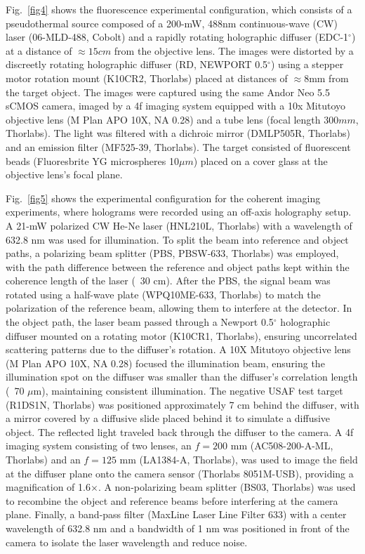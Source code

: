 \documentclass[pdflatex,sn-mathphys-num]{sn-jnl}%
\theoremstyle{thmstyleone}%
\theoremstyle{thmstyletwo}%
\theoremstyle{thmstylethree}%
\begin{document}
Fig.~\ref{fig4} shows the fluorescence experimental configuration, which consists of a pseudothermal source composed of a 200-mW, 488nm continuous-wave (CW) laser (06-MLD-488, Cobolt) and a rapidly rotating holographic diffuser (EDC-1$^\circ$) at a distance of $\approx 15cm$ from the objective lens. The images were distorted by a discreetly rotating holographic diffuser (RD, NEWPORT 0.5$^\circ$) using a stepper motor rotation mount (K10CR2, Thorlabs) placed at distances of $\approx 8$mm from the target object. The images were captured using the same Andor Neo 5.5 sCMOS camera, imaged by a 4f imaging system equipped with a 10x Mitutoyo objective lens (M Plan APO 10X, NA 0.28) and a tube lens (focal length $300mm$, Thorlabs). The light was filtered with a dichroic mirror (DMLP505R, Thorlabs) and an emission filter (MF525-39, Thorlabs). The target consisted of fluorescent beads (Fluoresbrite YG microspheres 10$\mu m$) placed on a cover glass at the objective lens's focal plane.

Fig.~\ref{fig5} shows the experimental configuration for the coherent imaging experiments, where holograms were recorded using an off-axis holography setup. A 21-mW polarized CW He-Ne laser (HNL210L, Thorlabs) with a wavelength of 632.8 nm was used for illumination. To split the beam into reference and object paths, a polarizing beam splitter (PBS, PBSW-633, Thorlabs) was employed, with the path difference between the reference and object paths kept within the coherence length of the laser (~30 cm). After the PBS, the signal beam was rotated using a half-wave plate (WPQ10ME-633, Thorlabs) to match the polarization of the reference beam, allowing them to interfere at the detector. In the object path, the laser beam passed through a Newport 0.5$^\circ$ holographic diffuser mounted on a rotating motor (K10CR1, Thorlabs), ensuring uncorrelated scattering patterns due to the diffuser's rotation. A 10X Mitutoyo objective lens (M Plan APO 10X, NA 0.28) focused the illumination beam, ensuring the illumination spot on the diffuser was smaller than the diffuser's correlation length (~70 $\mu$m), maintaining consistent illumination. The negative USAF test target (R1DS1N, Thorlabs) was positioned approximately 7 cm behind the diffuser, with a mirror covered by a diffusive slide placed behind it to simulate a diffusive object. The reflected light traveled back through the diffuser to the camera. A 4f imaging system consisting of two lenses, an $f=200$ mm (AC508-200-A-ML, Thorlabs) and an $f=125$ mm (LA1384-A, Thorlabs), was used to image the field at the diffuser plane onto the camera sensor (Thorlabs 8051M-USB), providing a magnification of 1.6$\times$. A non-polarizing beam splitter (BS03, Thorlabs) was used to recombine the object and reference beams before interfering at the camera plane. Finally, a band-pass filter (MaxLine Laser Line Filter 633) with a center wavelength of 632.8 nm and a bandwidth of 1 nm was positioned in front of the camera to isolate the laser wavelength and reduce noise.
\end{document}
